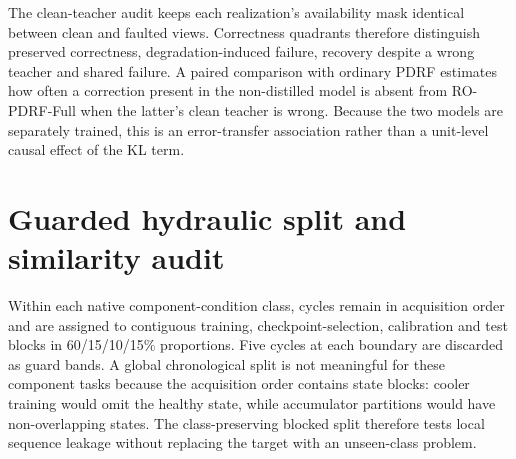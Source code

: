 \documentclass[10pt]{article}
\begin{document}
\begin{table}[ht]
\centering
\caption{RO-PDRF-Full minus RO-CAGF affected-AUROC by acquisition batch across fault realizations and seeds.}
\resizebox{0.76\textwidth}{!}{}
\end{table}

The clean-teacher audit keeps each realization's availability mask identical between clean and faulted views. Correctness quadrants therefore distinguish preserved correctness, degradation-induced failure, recovery despite a wrong teacher and shared failure. A paired comparison with ordinary PDRF estimates how often a correction present in the non-distilled model is absent from RO-PDRF-Full when the latter's clean teacher is wrong. Because the two models are separately trained, this is an error-transfer association rather than a unit-level causal effect of the KL term.

\begin{table}[ht]
\centering
\caption{Clean-teacher and faulted-prediction correctness quadrants across five models and eight realizations.}
\resizebox{0.65\textwidth}{!}{}
\end{table}

\begin{table}[ht]
\centering
\caption{Teacher-confidence audit. $\Delta p_y$ is RO-PDRF-Full minus PDRF true-class probability on the faulted observation.}
\resizebox{0.95\textwidth}{!}{}
\end{table}
\FloatBarrier

\section{Guarded hydraulic split and similarity audit}

Within each native component-condition class, cycles remain in acquisition order and are assigned to contiguous training, checkpoint-selection, calibration and test blocks in 60/15/10/15\% proportions. Five cycles at each boundary are discarded as guard bands. A global chronological split is not meaningful for these component tasks because the acquisition order contains state blocks: cooler training would omit the healthy state, while accumulator partitions would have non-overlapping states. The class-preserving blocked split therefore tests local sequence leakage without replacing the target with an unseen-class problem.
\end{document}
